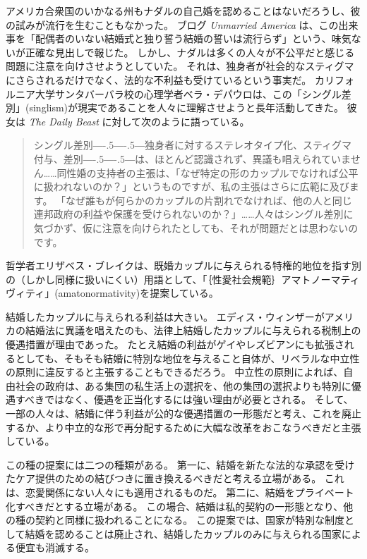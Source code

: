 \documentclass[paper=a4,book,openany]{jlreq}
\def\DDASH{―\kern-.5\zw―\kern-.5\zw―} %
\begin{document}
アメリカ合衆国のいかなる州もナダルの自己婚を認めることはないだろうし、彼の試みが流行を生むこともなかった。
ブログ \emph{Unmarried America} は、この出来事を「配偶者のいない結婚式と独り誓う結婚の誓いは流行らず」という、味気ないが正確な見出しで報じた\citep{coleman07:_spous_weddin_solo_vows_not_catch}。
しかし、ナダルは多くの人々が不公平だと感じる問題に注意を向けさせようとしていた。
それは、独身者が社会的なスティグマにさらされるだけでなく、法的な不利益も受けているという事実だ。
カリフォルニア大学サンタバーバラ校の心理学者ベラ・デパウロは、この「シングル差別」(singlism)が現実であることを人々に理解させようと長年活動してきた。
彼女は \emph{The Daily Beast} に対して次のように語っている。

\begin{quote}
  シングル差別{\DDASH}独身者に対するステレオタイプ化、スティグマ付与、差別{\DDASH}は、ほとんど認識されず、異議も唱えられていません……同性婚の支持者の主張は、「なぜ特定の形のカップルでなければ公平に扱われないのか？」というものですが、私の主張はさらに広範に及びます。
「なぜ誰もが何らかのカップルの片割れでなければ、他の人と同じ連邦政府の利益や保護を受けられないのか？」……人々はシングル差別に気づかず、仮に注意を向けられたとしても、それが問題だとは思わないのです。
\citep{kelly12:_singl_out}

\end{quote}

哲学者エリザベス・ブレイクは、既婚カップルに与えられる特権的地位を指す別の（しかし同様に扱いにくい）用語として、「｛性愛社会規範｝{アマトノーマティヴィティ}」(amatonormativity)を提案している。

結婚したカップルに与えられる利益は大きい\citep[pp.380--381]{sunstein08:_privat_marriag}。
エディス・ウィンザーがアメリカの結婚法に異議を唱えたのも、法律上結婚したカップルに与えられる税制上の優遇措置が理由であった。
たとえ結婚の利益がゲイやレズビアンにも拡張されるとしても、そもそも結婚に特別な地位を与えること自体が、リベラルな中立性の原則に違反すると主張することもできるだろう。
中立性の原則によれば、自由社会の政府は、ある集団の私生活上の選択を、他の集団の選択よりも特別に優遇すべきではなく、優遇を正当化するには強い理由が必要とされる。
そして、一部の人々は、結婚に伴う利益が公的な優遇措置の一形態だと考え、これを廃止するか、より中立的な形で再分配するために大幅な改革をおこなうべきだと主張している。

この種の提案には二つの種類がある。
第一に、結婚を新たな法的な承認を受けたケア提供のための結びつきに置き換えるべきだと考える立場がある。
これは、恋愛関係にない人々にも適用されるものだ。
第二に、結婚をプライベート化すべきだとする立場がある。
この場合、結婚は私的契約の一形態となり、他の種の契約と同様に扱われることになる。
この提案では、国家が特別な制度として結婚を認めることは廃止され、結婚したカップルのみに与えられる国家による便宜も消滅する。
\end{document}

